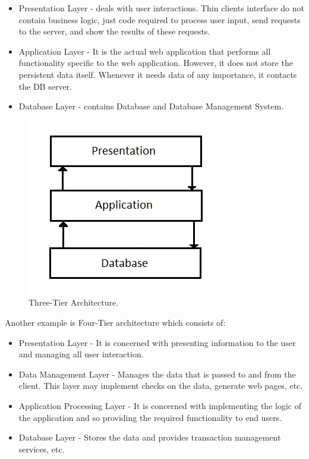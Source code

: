 \documentclass{article}
\begin{document}
\begin{itemize}

\item Presentation Layer - deals with user interactions. Thin clients interface do not contain business logic, just code required to process user input, send requests to the server, and show the results of these requests. 
\item Application Layer - It is the actual web application that performs all functionality specific to the web application. However, it does not store the persistent data itself. Whenever it needs data of any importance, it contacts the DB server. 
\item Database Layer - contains Database and Database Management System. 

\end{itemize}


\begin{figure}[h]
\centering
\includegraphics[scale=1]{3t.jpg}
\caption{Three-Tier Architecture.}
\label{fig_3t}
\end{figure}

\newpage
\noindent Another example is Four-Tier architecture which consists of:

\begin{itemize}

\item Presentation Layer - It is concerned with presenting information to the user and managing all user interaction.
\item Data Management Layer - Manages the data that is passed to and from the client. This layer may implement checks on the data, generate web pages, etc.
\item Application Processing Layer - It is concerned with implementing the logic of the application and so providing the required functionality to end users.
\item Database Layer - Stores the data and provides transaction management services, etc.

\end{itemize}
\end{document}
